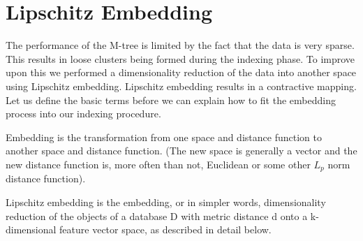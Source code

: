 \section{Lipschitz Embedding}

The performance of the M-tree is limited by the fact that the data is very sparse. This results in loose clusters being formed during the indexing phase. To improve upon this we performed a dimensionality reduction of the data into another space using Lipschitz embedding. Lipschitz embedding results in a contractive mapping. Let us define the basic terms before we can explain how to fit the embedding process into our indexing procedure.\\

\begin{dfn}
Embedding is the transformation from one space and distance function to another space and distance function. (The new space is generally a vector and the new distance function is, more often than not, Euclidean or some other $L_p$ norm distance function).
\end{dfn}


\begin{dfn}
Lipschitz embedding is the embedding, or in simpler words, dimensionality reduction of the objects of
a database D with metric distance d onto a k-dimensional feature vector space, as described in detail below.  
\end{dfn}

